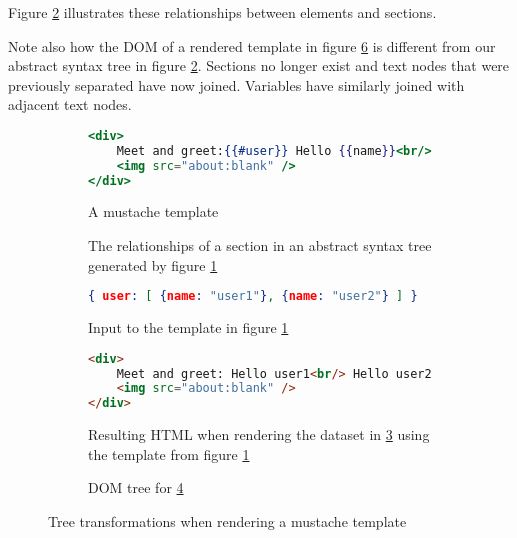 \documentclass[thesis.tex]{subfiles}
\begin{document}
Figure \ref{fig:relationships.ast} illustrates these relationships between elements
and sections.

Note also how the DOM of a rendered template in figure \ref{fig:rendered} is
different from our abstract syntax tree in figure \ref{fig:relationships.ast}.
Sections no longer exist and text nodes that were previously separated have now joined.
Variables have similarly joined with adjacent text nodes.

\begin{figure}
	\centering
	\begin{subfigure}{\linewidth}
		\caption{A mustache template}
		\label{fig:relationships.mustache}
		\begin{lstlisting}[language=mustache]
<div>
	Meet and greet:{{#user}} Hello {{name}}<br/>{{/user}}
	<img src="about:blank" />
</div>
		\end{lstlisting}
	\end{subfigure}
	
	\begin{subfigure}{\linewidth}
		\caption{The relationships of a section in an abstract syntax tree generated
		         by figure \ref{fig:relationships.mustache}}
		\label{fig:relationships.ast}
		\resizebox{\linewidth}{!}{}
	\end{subfigure}
	
	\begin{subfigure}{\linewidth}
		\caption{Input to the template in figure \ref{fig:relationships.mustache}}
		\label{fig:rendered.json}
		\begin{lstlisting}[language=JSON]
{ user: [ {name: "user1"}, {name: "user2"} ] }
		\end{lstlisting}
	\end{subfigure}
	
	\begin{subfigure}{\linewidth}
		\caption{Resulting HTML when rendering the dataset in \ref{fig:rendered.json}
		         using the template from figure \ref{fig:relationships.mustache}}
		\label{fig:rendered.html}
		\begin{lstlisting}[language=HTML]
<div>
	Meet and greet: Hello user1<br/> Hello user2<br/>
	<img src="about:blank" />
</div>
		\end{lstlisting}
	\end{subfigure}
	
	\begin{subfigure}{\linewidth}
		\caption{DOM tree for \ref{fig:rendered.html}}
		\label{fig:rendered.ast}
		\resizebox{\linewidth}{!}{}
	\end{subfigure}
	\caption{Tree transformations when rendering a mustache template}
	\label{fig:rendered}
\end{figure}
\end{document}
